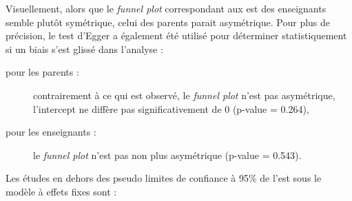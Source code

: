 Visuellement, alors que le \textit{funnel plot} correspondant aux \gls{est} des enseignants semble plutôt symétrique, celui des parents parait asymétrique. 
Pour plus de précision, le test d'Egger a également été utilisé pour déterminer statistiquement si un biais s'est glissé dans l'analyse \citep{Egger1997} :
\begin{description}
\item[pour les parents :] contrairement à ce qui est observé, le \textit{funnel plot} n'est pas asymétrique, l'intercept ne diffère pas 
significativement de 0 (p-value = 0.264),
\item[pour les enseignants :]  le \textit{funnel plot} n'est pas non plus asymétrique (p-value = 0.543).
\end{description}

Les études en dehors des pseudo limites de confiance à 95\% de l'\gls{est} sous le modèle à effets fixes sont : 
